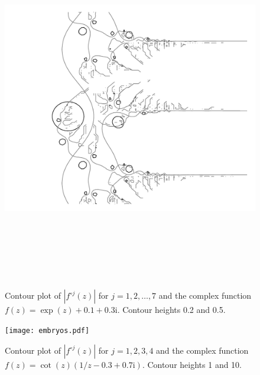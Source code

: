 \documentclass[12pt, a4paper]{amsart}
\newcommand{\mi}{\text{i}}  %
\begin{document}
\begin{figure}[!ht] 
\includegraphics[height=160mm, angle=-90]{landscape.pdf}
\caption{
Contour plot of $|f^{\circ j}(z)|$ for $j=1, 2, \ldots, 7$ and the complex function $f(z) = \exp(z) + 0.1 + 0.3\mi$.
Contour heights 0.2 and 0.5.
}
\end{figure}
\pagebreak
\begin{figure}[!ht] 
\texttt{[image: embryos.pdf]}
\caption{
Contour plot of $|f^{\circ j}(z)|$ for $j=1, 2, 3, 4$ and the complex function $f(z) = \cot(z)(1/z - 0.3 + 0.7\mi)$.
Contour heights 1 and 10.
}
\end{figure}
\pagebreak
\end{document}
